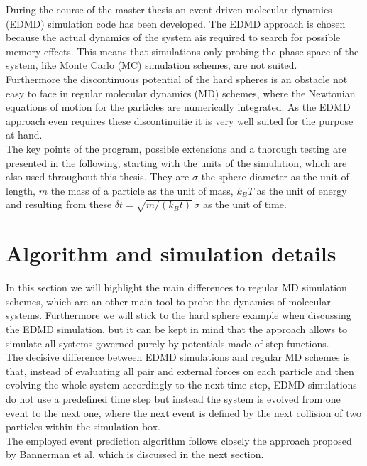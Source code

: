 
\label{chp:simulation}
During the course of the master thesis an event driven molecular dynamics (EDMD) simulation code has been developed. The EDMD approach is chosen because the actual dynamics of the system ais required to search for possible memory effects. This means that simulations only probing the phase space of the system, like Monte Carlo (MC) simulation schemes, are not suited.\\ 
Furthermore the discontinuous potential of the hard spheres is an obstacle not easy to face in regular molecular dynamics (MD) schemes, where the Newtonian equations of motion for the particles are numerically integrated. As the EDMD approach even requires these discontinuitie it is very well suited for the purpose at hand.\\ 
The key points of the program, possible extensions and a thorough testing are presented in the following, starting with the units of the simulation, which are also used throughout this thesis. They are $\sigma$ the sphere diameter as the unit of length, $m$ the mass of a particle as the unit of mass, $k_B T$ as the unit of energy and resulting from these $\delta t = \sqrt{m / (k_B t)} \, \sigma$ as the unit of time.

\section{Algorithm and simulation details}
\label{sec:simulation}
In this section we will highlight the main differences to regular MD simulation schemes, which are an other main tool to probe the dynamics of molecular systems. Furthermore we will stick to the hard sphere example when discussing the EDMD simulation, but it can be kept in mind that the approach allows to simulate all systems governed purely by potentials made of step functions.\\
 
The decisive difference between EDMD simulations and regular MD schemes is that, instead of evaluating all pair and external forces on each particle and then evolving the whole system accordingly to the next time step, EDMD simulations do not use a predefined time step but instead the system is evolved from one event to the next one, where the next event is defined by the next collision of two particles within the simulation box.\\

The employed event prediction algorithm follows closely the approach proposed by Bannerman et al.\cite{Bannerman2014} which is discussed in the next section.

